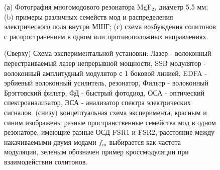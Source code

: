 
\begin{figure}[!htb]
\begin{minipage}{1\linewidth}
\end{minipage}
\caption{(а) Фотография многомодового резонатора MgF$_2$, диаметр 5.5 мм; (b) примеры различных семейств мод и распределения электрического поля внутри МШГ; (с) схема возбуждения солитонов с распространением в одном или противоположных направлениях.}
\label{Figure1_V1_c}
\end{figure}

\begin{figure}[!htb]
\begin{minipage}{1\linewidth}
\end{minipage}
\caption{(Сверху) Схема экспериментальной установки: Лазер - волоконный перестраиваемый лазер непрерывной мощности, SSB модулятор - волоконный амплитудный модулятор с 1 боковой линией, EDFA - эрбиевый волоконный усилитель, резонатор, Фильтр - волоконный Брэгговский фильтр, ФД - быстрый фотодиод, ОСА - оптический спектроанализатор, ЭСА - анализатор спектра электрических сигналов. (снизу) концептуальная схема эксперимента, красным и синим изображены разные пространственные семейства мод в одном резонаторе, имеющие разные ОСД FSR1 и FSR2, расстояние между накачиваемыми двумя модами $f_m$ выбирается как частота модуляции, зеленым обозначен пример кроссмодуляции при взаимодействии солитонов.}
\label{Figure1_V1_c}
\end{figure}


